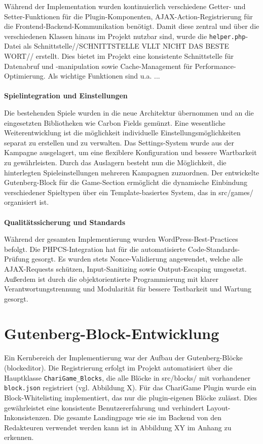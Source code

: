 Während der Implementation wurden kontinuierlich verschiedene Getter- und Setter-Funktionen für die Plugin-Komponenten, AJAX-Action-Registrierung für die Frontend-Backend-Kommunikation benötigt.
Damit diese zentral und über die verschiedenen Klassen hinaus im Projekt nutzbar sind, wurde die \texttt{helper.php}-Datei als Schnittstelle//SCHNITTSTELLE VLLT NICHT DAS BESTE WORT// erstellt.
Dies bietet im Projekt eine konsistente Schnittstelle für Datenabruf und -manipulation sowie Cache-Management für Performance-Optimierung.
Als wichtige Funktionen sind u.a. ...
\\\\
\textbf{Spielintegration und Einstellungen}

Die bestehenden Spiele wurden in die neue Architektur übernommen und an die eingesetzten Bibliotheken wie Carbon Fields gemünzt.
Eine wesentliche Weiterentwicklung ist die möglichkeit individuelle Einstellungsmöglichkeiten separat zu erstellen und zu verwalten.
Das Settings-System wurde aus der Kampagne ausgelagert, um eine flexiblere Konfiguration und bessere Wartbarkeit zu gewährleisten.
Durch das Auslagern besteht nun die Möglichkeit, die hinterlegten Spieleinstellungen mehreren Kampagnen zuzuordnen.
Der entwickelte Gutenberg-Block für die Game-Section ermöglicht die dynamische Einbindung verschiedener Spieltypen über ein Template-basiertes System, das in src/games/ organisiert ist.
\\\\
\textbf{Qualitätssicherung und Standards}

Während der gesamten Implementierung wurden WordPress-Best-Practices befolgt.
Die PHPCS-Integration hat für die automatisierte Code-Standards-Prüfung gesorgt.
Es wurden stets Nonce-Validierung angewendet, welche alle AJAX-Requests schützen, Input-Sanitizing sowie Output-Escaping umgesetzt.
Außerdem ist durch die objektorientierte Programmierung mit klarer Verantwortungstrennung und Modularität für bessere Testbarkeit und Wartung gesorgt.

\section{Gutenberg-Block-Entwicklung}

Ein Kernbereich der Implementierung war der Aufbau der Gutenberg-Blöcke (\gls{blockeditor}).
Die Registrierung erfolgt im Projekt automatisiert über die Hauptklasse \texttt{ChariGame\_Blocks}, die alle Blöcke in src/blocks/ mit vorhandener \texttt{block.json} registriert (vgl. Abbildung X). %
Für das ChariGame Plugin wurde ein Block-Whitelisting implementiert, das nur die plugin-eigenen Blöcke zulässt.
Dies gewährleistet eine konsistente Benutzererfahrung und verhindert Layout-Inkonsistenzen.
Die gesamte Landingpage wie sie im Backend von den Redakteuren verwendet werden kann ist in Abbildung XY im Anhang zu erkennen. %

